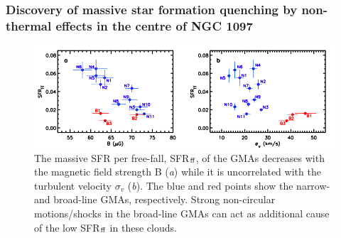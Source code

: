 \documentclass[10pt,aspectratio=169]{beamer}
\begin{document}
\begin{frame}
	\frametitle{Discovery of massive star formation quenching by non-thermal effects in the centre of NGC 1097 \citep{2018NatAs...2...83T}}
	\begin{figure}
		\begin{center}
			\includegraphics[width=1.\textwidth]{./images/taba2018_SFR.png}
			\caption[]{The massive SFR per free-fall, SFR$_{\rm ff}$, of the GMAs decreases with the magnetic field strength B ({\it a}) while it is uncorrelated with the turbulent velocity $\sigma_v$ ({\it b}).  The blue and red points show the narrow-  and broad-line GMAs, respectively. Strong non-circular motions/shocks in the broad-line GMAs can act as additional cause of the low SFR$_{\rm ff}$ in these clouds.}
		\end{center}
	\end{figure}
\end{frame}
\end{document}
